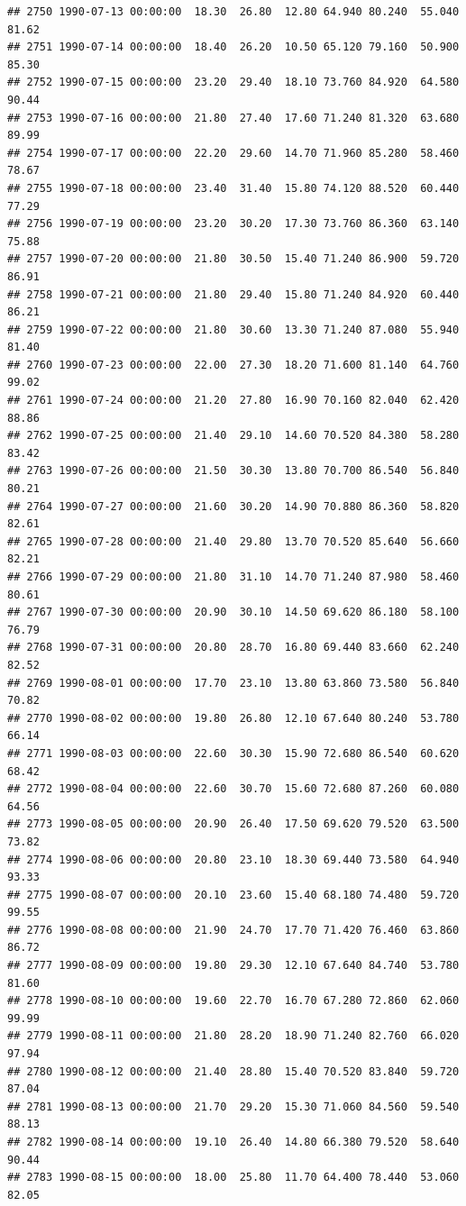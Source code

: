 \documentclass{article}\usepackage{graphicx, color}
\makeatletter
\newenvironment{kframe}{%
 \def\at@end@of@kframe{}%
 \ifinner\ifhmode%
  \def\at@end@of@kframe{\end{minipage}}%
  \begin{minipage}{\columnwidth}%
 \fi\fi%
 \def\FrameCommand##1{\hskip\@totalleftmargin \hskip-\fboxsep
 \colorbox{shadecolor}{##1}\hskip-\fboxsep
     \hskip-\linewidth \hskip-\@totalleftmargin \hskip\columnwidth}%
 \MakeFramed {\advance\hsize-\width
   \@totalleftmargin\z@ \linewidth\hsize
   \@setminipage}}%
 {\par\unskip\endMakeFramed%
 \at@end@of@kframe}
\newenvironment{knitrout}{}{} %
\makeatother
\begin{document}
\begin{knitrout}
\begin{kframe}
\begin{verbatim}
## 2750 1990-07-13 00:00:00  18.30  26.80  12.80 64.940 80.240  55.040  81.62
## 2751 1990-07-14 00:00:00  18.40  26.20  10.50 65.120 79.160  50.900  85.30
## 2752 1990-07-15 00:00:00  23.20  29.40  18.10 73.760 84.920  64.580  90.44
## 2753 1990-07-16 00:00:00  21.80  27.40  17.60 71.240 81.320  63.680  89.99
## 2754 1990-07-17 00:00:00  22.20  29.60  14.70 71.960 85.280  58.460  78.67
## 2755 1990-07-18 00:00:00  23.40  31.40  15.80 74.120 88.520  60.440  77.29
## 2756 1990-07-19 00:00:00  23.20  30.20  17.30 73.760 86.360  63.140  75.88
## 2757 1990-07-20 00:00:00  21.80  30.50  15.40 71.240 86.900  59.720  86.91
## 2758 1990-07-21 00:00:00  21.80  29.40  15.80 71.240 84.920  60.440  86.21
## 2759 1990-07-22 00:00:00  21.80  30.60  13.30 71.240 87.080  55.940  81.40
## 2760 1990-07-23 00:00:00  22.00  27.30  18.20 71.600 81.140  64.760  99.02
## 2761 1990-07-24 00:00:00  21.20  27.80  16.90 70.160 82.040  62.420  88.86
## 2762 1990-07-25 00:00:00  21.40  29.10  14.60 70.520 84.380  58.280  83.42
## 2763 1990-07-26 00:00:00  21.50  30.30  13.80 70.700 86.540  56.840  80.21
## 2764 1990-07-27 00:00:00  21.60  30.20  14.90 70.880 86.360  58.820  82.61
## 2765 1990-07-28 00:00:00  21.40  29.80  13.70 70.520 85.640  56.660  82.21
## 2766 1990-07-29 00:00:00  21.80  31.10  14.70 71.240 87.980  58.460  80.61
## 2767 1990-07-30 00:00:00  20.90  30.10  14.50 69.620 86.180  58.100  76.79
## 2768 1990-07-31 00:00:00  20.80  28.70  16.80 69.440 83.660  62.240  82.52
## 2769 1990-08-01 00:00:00  17.70  23.10  13.80 63.860 73.580  56.840  70.82
## 2770 1990-08-02 00:00:00  19.80  26.80  12.10 67.640 80.240  53.780  66.14
## 2771 1990-08-03 00:00:00  22.60  30.30  15.90 72.680 86.540  60.620  68.42
## 2772 1990-08-04 00:00:00  22.60  30.70  15.60 72.680 87.260  60.080  64.56
## 2773 1990-08-05 00:00:00  20.90  26.40  17.50 69.620 79.520  63.500  73.82
## 2774 1990-08-06 00:00:00  20.80  23.10  18.30 69.440 73.580  64.940  93.33
## 2775 1990-08-07 00:00:00  20.10  23.60  15.40 68.180 74.480  59.720  99.55
## 2776 1990-08-08 00:00:00  21.90  24.70  17.70 71.420 76.460  63.860  86.72
## 2777 1990-08-09 00:00:00  19.80  29.30  12.10 67.640 84.740  53.780  81.60
## 2778 1990-08-10 00:00:00  19.60  22.70  16.70 67.280 72.860  62.060  99.99
## 2779 1990-08-11 00:00:00  21.80  28.20  18.90 71.240 82.760  66.020  97.94
## 2780 1990-08-12 00:00:00  21.40  28.80  15.40 70.520 83.840  59.720  87.04
## 2781 1990-08-13 00:00:00  21.70  29.20  15.30 71.060 84.560  59.540  88.13
## 2782 1990-08-14 00:00:00  19.10  26.40  14.80 66.380 79.520  58.640  90.44
## 2783 1990-08-15 00:00:00  18.00  25.80  11.70 64.400 78.440  53.060  82.05

\end{verbatim}
\end{kframe}
\end{knitrout}
\end{document}
